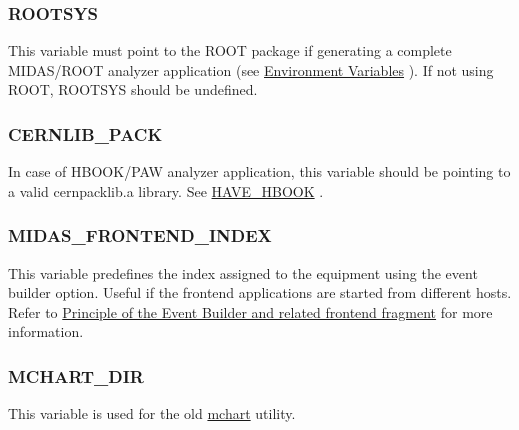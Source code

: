 \label{BuildingOptions_idx_ROOTSYS}
\hypertarget{BuildingOptions_idx_ROOTSYS}{}
 

\hypertarget{BuildingOptions_BO_ROOTSYS}{}\subsubsection{ROOTSYS}\label{BuildingOptions_BO_ROOTSYS}
This variable must point to the ROOT package if generating a complete MIDAS/ROOT analyzer application (see \hyperlink{Q_Linux_Q_Linux_Environment_Variables}{Environment Variables} ). If not using ROOT, ROOTSYS should be undefined.

\label{BuildingOptions_idx_CERNLIB_PACK}
\hypertarget{BuildingOptions_idx_CERNLIB_PACK}{}
 

\hypertarget{BuildingOptions_BO_CERNLIB_PACK}{}\subsubsection{CERNLIB\_\-PACK}\label{BuildingOptions_BO_CERNLIB_PACK}
In case of HBOOK/PAW analyzer application, this variable should be pointing to a valid cernpacklib.a library. See \hyperlink{BuildingOptions_BO_HAVE_HBOOK}{HAVE\_\-HBOOK} .

\label{BuildingOptions_idx_MIDAS_FRONTEND_INDEX}
\hypertarget{BuildingOptions_idx_MIDAS_FRONTEND_INDEX}{}
 

\hypertarget{BuildingOptions_BO_MIDAS_FRONTEND_INDEX}{}\subsubsection{MIDAS\_\-FRONTEND\_\-INDEX}\label{BuildingOptions_BO_MIDAS_FRONTEND_INDEX}
This variable predefines the index assigned to the equipment using the event builder option. Useful if the frontend applications are started from different hosts. Refer to \hyperlink{FE_Event_Builder_FE_principle_eb}{Principle of the Event Builder and related frontend fragment} for more information.



\hypertarget{BuildingOptions_BO_MCHART_DIR}{}\subsubsection{MCHART\_\-DIR}\label{BuildingOptions_BO_MCHART_DIR}
This variable is used for the old \hyperlink{F_LogUtil_F_mchart_utility}{mchart} utility.

\label{index_end}
\hypertarget{index_end}{}
 \par
  